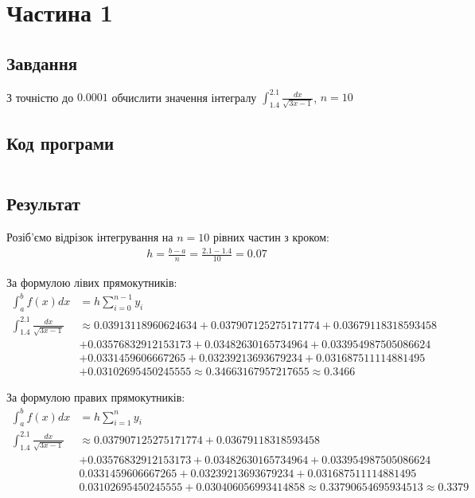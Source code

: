 \section{Частина 1}
\label{sec:task1}

\subsection{Завдання}
\label{subsec:task1_task}

З точністю до $0.0001$ обчислити значення інтегралу
$\int_{1.4}^{2.1} \frac{dx}{\sqrt{3x - 1}}$, $n = 10$

\subsection{Код програми}
\label{subsec:task1_code}
\inputminted{python}{../src/task1.py}

\subsection{Результат}
\label{subsec:task1_result}

Розіб'ємо відрізок інтегрування на $n = 10$ рівних частин з кроком:
\begin{align}
    h = \frac{b - a}{n} = \frac{2.1 - 1.4}{10} = 0.07
\end{align}

За формулою лівих прямокутників:
\begin{align}
    \int_{a}^{b} f(x) dx
     & = h \sum_{i = 0}^{n - 1} y_i \\
    \int_{1.4}^{2.1} \frac{dx}{\sqrt{3x - 1}}
     & \approx
    0.03913118960624634
    + 0.037907125275171774
    + 0.03679118318593458           \\
     & + 0.03576832912153173
    + 0.03482630165734964
    + 0.033954987505086624          \\
     & + 0.0331459606667265
    + 0.03239213693679234
    + 0.031687511114881495          \\
     & + 0.03102695450245555
    \approx 0.34663167957217655
    \approx 0.3466
\end{align}

За формулою правих прямокутників:
\begin{align}
    \int_{a}^{b} f(x) dx
     & = h \sum_{i = 1}^{n} y_i \\
    \int_{1.4}^{2.1} \frac{dx}{\sqrt{3x - 1}}
     & \approx
    0.037907125275171774
    + 0.03679118318593458       \\
     & + 0.03576832912153173
    + 0.03482630165734964
    + 0.033954987505086624      \\
     & 0.0331459606667265
    + 0.03239213693679234
    + 0.031687511114881495      \\
     & 0.03102695450245555
    + 0.030406056993414858
    \approx 0.33790654695934513
    \approx 0.3379
\end{align}


